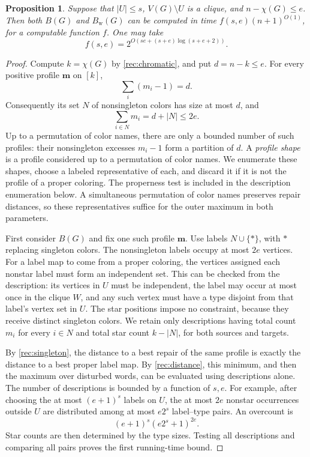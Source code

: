 \documentclass[10pt,a4paper]{amsart}
\numberwithin{equation}{section}
\newtheorem{proposition}[theorem]{Proposition}
\theoremstyle{definition}
\theoremstyle{remark}
\begin{document}
\begin{proposition}\label{rec:cocover}
Suppose that $|U|\leq s$, $V(G)\setminus U$ is a clique, and
$n-\chi(G)\leq e$. Then both $B(G)$ and $B_{\mathrm w}(G)$ can
be computed in time $f(s,e)(n+1)^{O(1)}$, for a computable function $f$.
One may take
\[
f(s,e)=2^{O(se+(s+e)\log(s+e+2))}.
\]
\end{proposition}
\begin{proof}
Compute $k=\chi(G)$ by \cref{rec:chromatic}, and put
$d=n-k\leq e$. For every positive profile $\mathbf m$ on $[k]$,
\[
\sum_i(m_i-1)=d.
\]
Consequently its set $N$ of nonsingleton colors has size at most
$d$, and
\[
\sum_{i\in N}m_i=d+|N|\leq2e.
\]
Up to a permutation of color names, there are only a bounded number
of such profiles: their nonsingleton excesses $m_i-1$ form a
partition of $d$. A \emph{profile shape} is a profile considered up
to a permutation of color names. We enumerate these shapes, choose a
labeled representative of each, and discard it if it is not the
profile of a proper coloring. The properness test is included in
the description enumeration below. A simultaneous permutation of
color names preserves repair distances, so these representatives
suffice for the outer maximum in both parameters.

First consider $B(G)$ and fix one such profile $\mathbf m$.
Use labels $N\cup\{*\}$, with $*$ replacing singleton colors.
The nonsingleton labels occupy at most $2e$ vertices. For a label
map to come from a proper coloring, the vertices assigned each
nonstar label must form an independent set. This can be checked from
the description: its vertices in $U$ must be independent, the label
may occur at most once in the clique $W$, and any such vertex must have a type
disjoint from that label's vertex set in $U$. The star positions impose no
constraint, because they receive distinct singleton colors.
We retain only descriptions having total count $m_i$ for every
$i\in N$ and total star count $k-|N|$, for both sources and targets.

By \cref{rec:singleton}, the distance to a best repair of the
same profile is exactly the distance to a best proper label map.
By \cref{rec:distance}, this minimum, and then the maximum
over disturbed words, can be evaluated using descriptions alone.
The number of descriptions is bounded by a function of $s,e$.
For example, after choosing the at most $(e+1)^s$ labels on $U$,
the at most $2e$ nonstar occurrences outside $U$ are distributed
among at most $e2^s$ label--type pairs. An overcount is
\[
(e+1)^s(e2^s+1)^{2e}.
\]
Star counts are then determined by the type sizes. Testing all
descriptions and comparing all pairs proves the first running-time
bound.


\end{proof}
\end{document}
